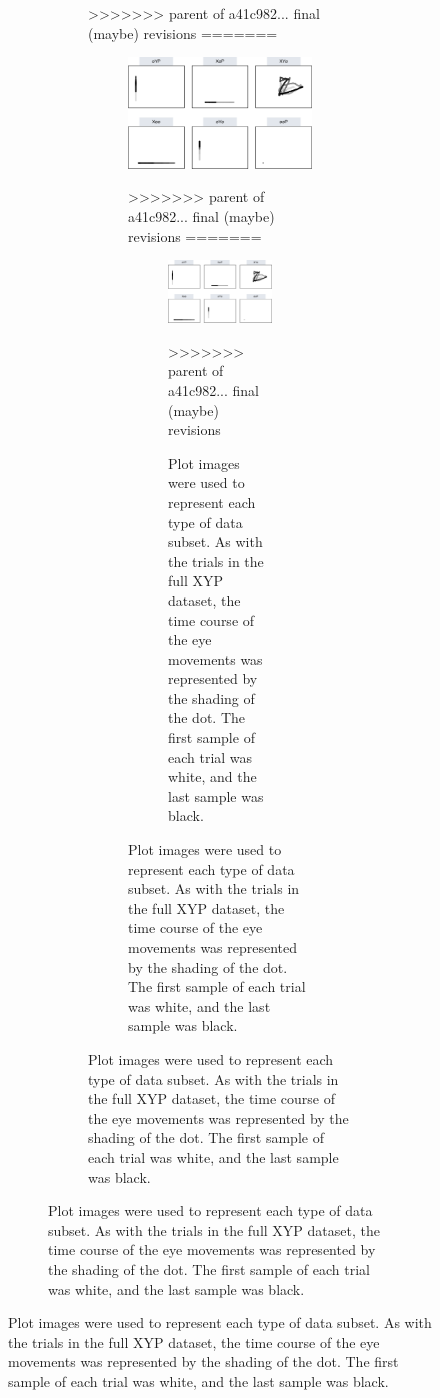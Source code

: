 \documentclass[
  english,
  man, donotrepeattitle,floatsintext]{apa6}
\begin{document}
\begin{figure}
\begin{figure}
\begin{figure}
>>>>>>> parent of a41c982... final (maybe) revisions
=======
\begin{figure}
\centering
\includegraphics{figures/subset_imgs.pdf}
\caption{\label{fig:ave-subset}Plot images were used to represent each type of data subset. As with the trials in the full XYP dataset, the time course of the eye movements was represented by the shading of the dot. The first sample of each trial was white, and the last sample was black.}
>>>>>>> parent of a41c982... final (maybe) revisions
=======
\begin{figure}
\centering
\includegraphics{figures/subset_imgs.pdf}
\caption{\label{fig:ave-subset}Plot images were used to represent each type of data subset. As with the trials in the full XYP dataset, the time course of the eye movements was represented by the shading of the dot. The first sample of each trial was white, and the last sample was black.}
>>>>>>> parent of a41c982... final (maybe) revisions
\end{figure}


\end{figure}
\end{figure}
\end{figure}
\end{figure}
\end{document}

